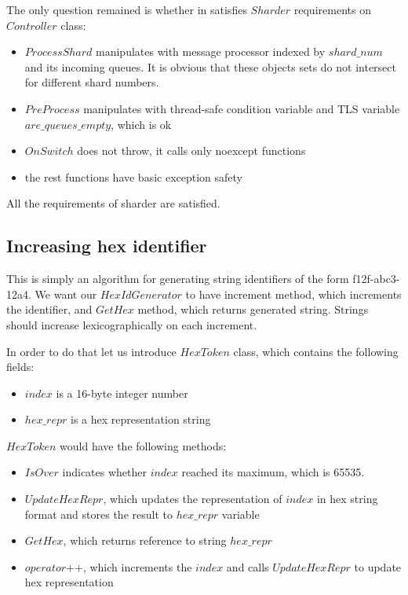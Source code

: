 \documentclass{article}
\begin{document}
\begin{samepage}
	The only question remained is whether in satisfies $Sharder$ requirements on $Controller$ class:
	\begin{itemize}
		\item $ProcessShard$ manipulates with message processor indexed by $shard\_num$ and its incoming queues. It is obvious that these objects sets do not intersect for different shard numbers.
		\item $PreProcess$ manipulates with thread-safe condition variable and TLS variable\\
			$are\_queues\_empty$, which is ok
		\item $OnSwitch$ does not throw, it calls only noexcept functions
		\item the rest functions have basic exception safety
	\end{itemize}
\end{samepage}
All the requirements of sharder are satisfied.

\subsection{Increasing hex identifier}
\label{subsec:increasing_hex_identifier}

This is simply an algorithm for generating string identifiers of the form f12f-abc3-12a4. We want our $HexIdGenerator$ to have increment method, which increments the identifier, and $GetHex$ method, which returns generated string. Strings should increase lexicographically on each increment.

In order to do that let us introduce $HexToken$ class, which contains the following fields:
\begin{itemize}
	\item $index$ is a 16-byte integer number
	\item $hex\_repr$ is a hex representation string
\end{itemize}

$HexToken$ would have the following methods:
\begin{itemize}
	\item $IsOver$ indicates whether $index$ reached its maximum, which is 65535.
	\item $UpdateHexRepr$, which updates the representation of $index$ in hex string format and stores the result to $hex\_repr$ variable
	\item $GetHex$, which returns reference to string $hex\_repr$
	\item $operator\mbox{++}$, which increments the $index$ and calls $UpdateHexRepr$ to update hex representation
\end{itemize}
\end{document}

